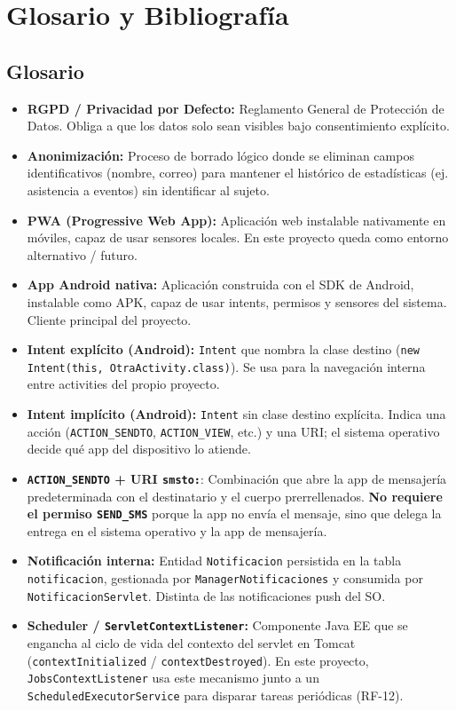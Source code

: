 \documentclass{report}
\begin{document}
\section{Glosario y Bibliografía}
\subsection{Glosario}
\begin{itemize}
    \item \textbf{RGPD / Privacidad por Defecto:} Reglamento General de Protección de Datos. Obliga a que los datos solo sean visibles bajo consentimiento explícito.
    \item \textbf{Anonimización:} Proceso de borrado lógico donde se eliminan campos identificativos (nombre, correo) para mantener el histórico de estadísticas (ej. asistencia a eventos) sin identificar al sujeto.
    \item \textbf{PWA (Progressive Web App):} Aplicación web instalable nativamente en móviles, capaz de usar sensores locales. En este proyecto queda como entorno alternativo / futuro.
    \item \textbf{App Android nativa:} Aplicación construida con el SDK de Android, instalable como APK, capaz de usar intents, permisos y sensores del sistema. Cliente principal del proyecto.
    \item \textbf{Intent explícito (Android):} \texttt{Intent} que nombra la clase destino (\texttt{new Intent(this, OtraActivity.class)}). Se usa para la navegación interna entre activities del propio proyecto.
    \item \textbf{Intent implícito (Android):} \texttt{Intent} sin clase destino explícita. Indica una acción (\texttt{ACTION\_SENDTO}, \texttt{ACTION\_VIEW}, etc.) y una URI; el sistema operativo decide qué app del dispositivo lo atiende.
    \item \textbf{\texttt{ACTION\_SENDTO} + URI \texttt{smsto:}}: Combinación que abre la app de mensajería predeterminada con el destinatario y el cuerpo prerrellenados. \textbf{No requiere el permiso \texttt{SEND\_SMS}} porque la app no envía el mensaje, sino que delega la entrega en el sistema operativo y la app de mensajería.
    \item \textbf{Notificación interna:} Entidad \texttt{Notificacion} persistida en la tabla \texttt{notificacion}, gestionada por \texttt{ManagerNotificaciones} y consumida por \texttt{NotificacionServlet}. Distinta de las notificaciones push del SO.
    \item \textbf{Scheduler / \texttt{ServletContextListener}:} Componente Java EE que se engancha al ciclo de vida del contexto del servlet en Tomcat (\texttt{contextInitialized} / \texttt{contextDestroyed}). En este proyecto, \texttt{JobsContextListener} usa este mecanismo junto a un \texttt{ScheduledExecutorService} para disparar tareas periódicas (RF-12).

\end{itemize}
\end{document}
